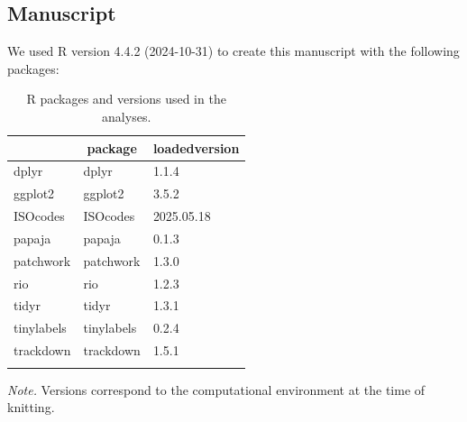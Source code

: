 \documentclass[
  man,floatsintext]{apa6}
\begin{document}
\subsection{Manuscript}\label{manuscript}

We used R version 4.4.2 (2024-10-31) to create this manuscript with the following packages:

\begin{table}[H]

\begin{center}
\begin{threeparttable}

\caption{\label{tab:unnamed-chunk-11}R packages and versions used in the analyses.}

\begin{tabular}{lll}
\toprule
 & \multicolumn{1}{c}{package} & \multicolumn{1}{c}{loadedversion}\\
\midrule
dplyr & dplyr & 1.1.4\\
ggplot2 & ggplot2 & 3.5.2\\
ISOcodes & ISOcodes & 2025.05.18\\
papaja & papaja & 0.1.3\\
patchwork & patchwork & 1.3.0\\
rio & rio & 1.2.3\\
tidyr & tidyr & 1.3.1\\
tinylabels & tinylabels & 0.2.4\\
trackdown & trackdown & 1.5.1\\
\bottomrule
\addlinespace
\end{tabular}

\begin{tablenotes}[para]
\normalsize{\textit{Note.} Versions correspond to the computational environment at the time of knitting.}
\end{tablenotes}

\end{threeparttable}
\end{center}

\end{table}
\end{document}
